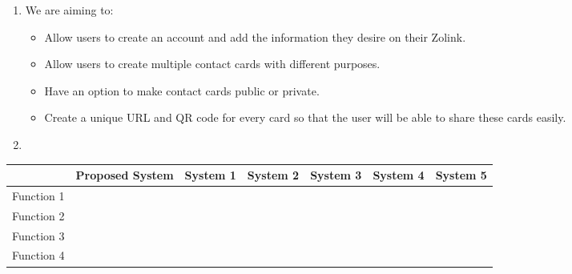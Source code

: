 \documentclass[12pt]{article}%
\begin{document}
\begin{enumerate}
\begin{enumerate}
            \item We are aiming to:
            \begin{itemize}
            	\item Allow users to create an account and add the information they desire on their Zolink.
            	\item Allow users to create multiple contact cards with different purposes.
            	\item Have an option to make contact cards public or private.
            	\item Create a unique URL and QR code for every card so that the user will be able to share these cards easily.
            \end{itemize}
            \item
        \end{enumerate}
\end{enumerate}

\begin{center}
    \begin{tabular}{|l|l|l|l|l|l|l|}
        \hline
         & Proposed System & System 1 & System 2 & System 3 & System 4 & System 5 \\
         \hline
        Function 1 & & & & & & \\
        \hline
        Function 2 & & & & & & \\
        \hline
        Function 3 & & & & & & \\
        \hline
        Function 4 & & & & & & \\
         \hline
    \end{tabular}
\end{center}

\end{document}
